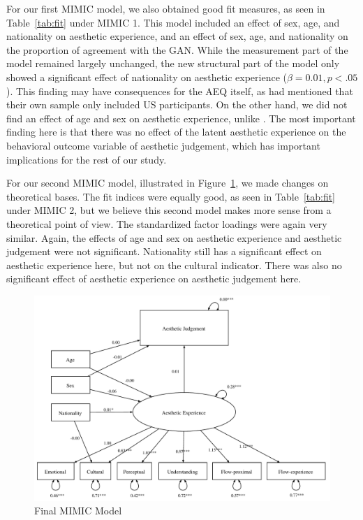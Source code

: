 \documentclass[../main.tex]{subfiles}
\begin{document}
	For our first MIMIC model, we also obtained good fit measures, as seen in Table~\ref{tab:fit} under MIMIC 1. This model included an effect of sex, age, and nationality on aesthetic experience, and an effect of sex, age, and nationality on the proportion of agreement with the GAN. While the measurement part of the model remained largely unchanged, the new structural part of the model only showed a significant effect of nationality on aesthetic experience ($\beta = 0.01, p<.05$). This finding may have consequences for the AEQ itself, as \textcite{wanzerExperiencingFlowViewing2020} had mentioned that their own sample only included US participants. On the other hand, we did not find an effect of age and sex on aesthetic experience, unlike \textcite{wanzerExperiencingFlowViewing2020}. The most important finding here is that there was no effect of the latent aesthetic experience on the behavioral outcome variable of aesthetic judgement, which has important implications for the rest of our study.
	
	For our second MIMIC model, illustrated in Figure~\ref{fig:finalmodel}, we made changes on theoretical bases. The fit indices were equally good, as seen in Table~\ref{tab:fit} under MIMIC 2, but we believe this second model makes more sense from a theoretical point of view. The standardized factor loadings were again very similar. Again, the effects of age and sex on aesthetic experience and aesthetic judgement were not significant. Nationality still has a significant effect on aesthetic experience here, but not on the cultural indicator. There was also no significant effect of aesthetic experience on aesthetic judgement here.

	\begin{figure}[t]
		\caption{Final MIMIC Model}
		\label{fig:finalmodel}
		\includegraphics[width=1\linewidth]{images/model3.pdf}
	\end{figure}
\end{document}
